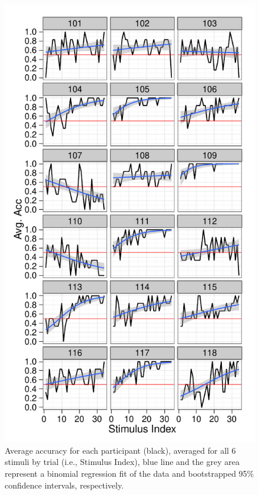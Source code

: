 \documentclass[doc,12pt]{apa}        %
\begin{document}
\begin{figure}[tp]
	\includegraphics{f_all_sS_acc}
    \centering
	\caption{Average accuracy for each participant (black), averaged for all 6 stimuli by trial (i.e., Stimulus Index), blue line and the grey area represent a binomial regression fit of the data and bootstrapped 95\% confidence intervals, respectively.}
	\label{fig:sacc}
\end{figure}
\end{document}
